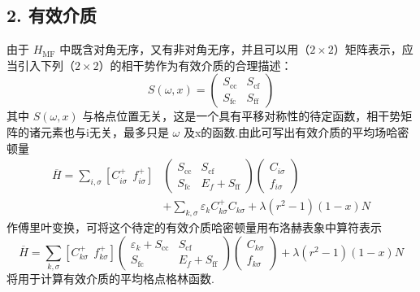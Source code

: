 \subsection*{2. 有效介质}

由于 $H_{\mathrm{MF}}$ 中既含对角无序，又有非对角无序，并且可以用（$2\times2$）矩阵表示，应当引入下列（$2\times2$）的相干势作为有效介质的合理描述：
\begin{equation}
  S\left(\omega,x\right)=
  \begin{pmatrix}S_{\mathrm{cc}} & S_{\mathrm{cf}}\\ S_{\mathrm{fc}} & S_{\mathrm{ff}}\end{pmatrix}
\end{equation}
其中 $S\left(\omega,x\right)$ 与格点位置无关，这是一个具有平移对称性的待定函数，相干势矩阵的诸元素也与i无关，最多只是 $\omega$ 及x的函数.由此可写出有效介质的平均场哈密顿量
\begin{equation}
\begin{aligned}
  \overline{H}=\sum_{i,\sigma}\left[C_{i\sigma}^{+}\ \ f_{i\sigma}^{+}\right]
  &\begin{pmatrix}S_{\mathrm{cc}} & S_{\mathrm{cf}}\\ S_{\mathrm{fc}} & E_{f}+S_{\mathrm{ff}}\end{pmatrix}
  \begin{pmatrix}C_{i\sigma}\\ f_{i\sigma}\end{pmatrix}\\
  &+\sum_{k,\sigma}\varepsilon_{k}C_{k\sigma}^{+}C_{k\sigma}
  +\lambda\left(r^{2}-1\right)\left(1-x\right)N
\end{aligned}
\end{equation}
作傅里叶变换，可将这个待定的有效介质哈密顿量用布洛赫表象中算符表示
\begin{equation}
  \overline{H}=\sum_{k,\sigma}\left[C_{k\sigma}^{+}\ \ f_{k\sigma}^{+}\right]
  \begin{pmatrix}\varepsilon_{k}+S_{\mathrm{cc}} & S_{\mathrm{cf}}\\ S_{\mathrm{fc}} & E_{f}+S_{\mathrm{ff}}\end{pmatrix}
  \begin{pmatrix}C_{k\sigma}\\ f_{k\sigma}\end{pmatrix}
  +\lambda\left(r^{2}-1\right)\left(1-x\right)N
\end{equation}
将用于计算有效介质的平均格点格林函数.

